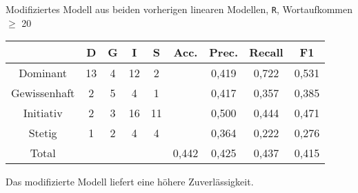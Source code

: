 \begin{frame}
Modifiziertes Modell aus beiden vorherigen linearen Modellen, \texttt{R}, Wortaufkommen $\geq$ 20\\
\vspace{12pt}
\begin{tabular}{|c|c|c|c|c|c|c|c|c|}
\hline
				& D 	& G	& I & S	& Acc.	& Prec. & Recall	& F1\\
\hline
Dominant 		& 13	& 4 & 12& 2 &      	& 0,419 & 0,722 	& 0,531\\
Gewissenhaft 	& 2 	& 5 & 4 & 1 & 		& 0,417 & 0,357 	& 0,385\\
Initiativ 		& 2 	& 3	& 16& 11& 		& 0,500	& 0,444 	& 0,471\\
Stetig 			& 1 	& 2 & 4	& 4 & 		& 0,364	& 0,222 	& 0,276\\
\hline
Total 			& 		& 	& 	& 	& 0,442	& 0,425 & 0,437	  	& 0,415\\
\hline
\end{tabular}
 \vspace{12pt}
 
Das modifizierte Modell liefert eine höhere Zuverlässigkeit.
\end{frame}
